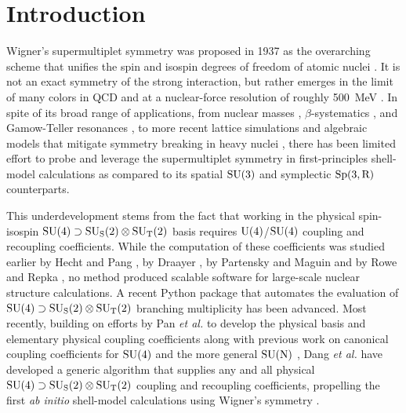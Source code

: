 \documentclass[aps,onecolumn,10pt,superscriptaddress,floatfix,nofootinbib]{revtex4}
\begin{document}
\section{Introduction}
\label{sec:intro}

Wigner's supermultiplet symmetry was proposed in 1937 as the overarching scheme that
unifies the spin and isospin degrees of freedom of atomic nuclei \cite{Wigner1937PR}.
It is not an exact symmetry of the strong interaction, but rather emerges in the limit of many colors
in QCD \cite{Kaplan1996PLB} and at a nuclear-force resolution of roughly 500~MeV \cite{Lee2021PRL,Timoteo2012PRC}.
In spite of its broad range of applications, from nuclear masses \cite{Cauvin1981NPA,Isacker1997FoP,Dang2026_2},
$\beta$-systematics \cite{Wigner1939PR,Fujita1965NP,Muli2026PRL}, 
and Gamow-Teller resonances \cite{Lutostansky2016EPJ},
to more recent lattice simulations \cite{Lee2025ARNPS} and algebraic models that
mitigate symmetry breaking in heavy nuclei \cite{Isacker1999PRL,Kota2024PScr}, there has been 
limited effort to probe and leverage the supermultiplet symmetry in first-principles shell-model
calculations as compared to its spatial $\rm SU(3)$ \cite{Elliott1958PRSA,Elliott1958PRSA-II,Dytrych2013PRL}
and symplectic $\rm Sp(3,R)$ \cite{Dytrych2020PRL,McCoy2020PRL} counterparts.

This underdevelopment stems from the fact that working in the physical spin-isospin 
$\rm SU(4) \supset SU_S(2) \otimes SU_T(2)$ basis 
requires $\rm U(4)$/$\rm SU(4)$ coupling and recoupling coefficients. 
While the computation of these coefficients was studied earlier by Hecht and
Pang \cite{Hecht1969JMP}, by Draayer \cite{Draayer1970JMP}, by Partensky and Maguin \cite{Partensky1978JMP}
and by Rowe and Repka \cite{Rowe1997FoP}, no method produced scalable software
for large-scale nuclear structure calculations.
A recent Python package \cite{Quintero2026CPC} that automates the evaluation of 
$\rm SU(4) \supset SU_S(2) \otimes SU_T(2)$ branching multiplicity has been advanced.
Most recently, building on efforts by Pan \textit{et al.} to develop the physical basis and 
elementary physical coupling coefficients \cite{Pan2023EPJP,Pan2023NPA,Pan2024CPC} 
along with previous work on canonical coupling coefficients for $\rm SU(4)$ \cite{Kuhn2008CPC} 
and the more general $\rm SU(N)$ \cite{Alex2011JMP}, Dang \textit{et al.} have developed
a generic algorithm \cite{Dang2024EPJP2} that supplies any and all physical 
$\rm SU(4) \supset SU_S(2) \otimes SU_T(2)$ coupling and recoupling coefficients,
propelling the first \textit{ab initio} shell-model calculations using Wigner's symmetry \cite{Dang2026_1}.
\end{document}
